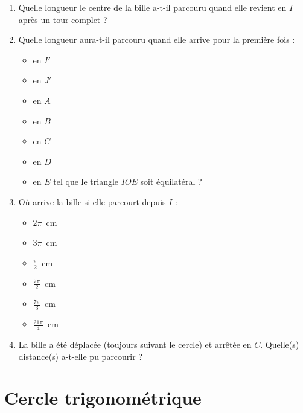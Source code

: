 \documentclass[10pt]{article}
\begin{document}
    \begin{enumerate}
      \item Quelle longueur le centre de la bille a-t-il parcouru quand elle revient en $I$ après un tour complet ?

        \dotfill
      \item Quelle longueur aura-t-il parcouru quand elle arrive pour la première fois :
        \begin{multicols}{3}
          \begin{itemize}[$\bullet$]
          \item en $I'$ \dotfill
          \item en $J'$ \dotfill
          \item en $A$ \dotfill
          \item en $B$\dotfill
          \item en $C$ \dotfill
          \item en $D$\dotfill
        \end{itemize}
      \end{multicols}
      \begin{itemize}[$\bullet$]
          \item en $E$ tel que le triangle $IOE$ soit équilatéral ? \dotfill
        \end{itemize}
      \item Où arrive la bille si elle parcourt depuis $I$ :
        \begin{multicols}{3}
          \begin{itemize}[$\bullet$]
          \item $2\pi$~cm\dotfill
          \item $3\pi$~cm\dotfill
          \item $\frac{\pi}{2}$~cm\dotfill
          \item $\frac{7\pi}{2}$~cm\dotfill
          \item $\frac{7\pi}{3}$~cm\dotfill
          \item $\frac{21\pi}{4}$~cm\dotfill
        \end{itemize}
      \end{multicols}
    \item La bille a été déplacée (toujours suivant le cercle) et arrêtée en
      $C$. Quelle(s) distance(s) a-t-elle pu parcourir ? \dotfill
    \end{enumerate}



\section{Cercle trigonométrique}
\end{document}
